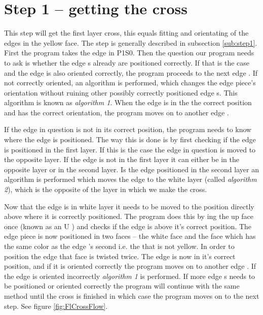 \section{Step 1 -- getting the cross}
This step will get the first layer cross, this equals fitting and orientating of the edges in the yellow face. 
The step is generally described in subsection \ref{sub:step1}.
First the program takes the edge \cubie{} in \cubicle{} P1S0.
Then the question our program needs to ask is whether the edge \cpiece{}s already are positioned correctly.
If that is the case and the edge \cpiece{} is also oriented correctly, the program proceeds to the next edge \cpiece{}.
If not correctly oriented, an algorithm is performed, which changes the edge piece's orientation without ruining other possibly correctly positioned edge \cpiece{}s. 
This algorithm is known as \textit{algorithm 1}. When the edge \cpiece{} is in the the correct position and has the correct orientation, the program moves on to another edge \cpiece{}. 

If the edge \cpiece{} in question is not in its correct position, the program needs to know where the edge is positioned. 
The way this is done is by first checking if the edge \cpiece{} is positioned in the first layer. 
If this is the case the edge \cpiece{} in question is moved to the opposite layer. 
If the edge \cpiece{} is not in the first layer it can either be in the opposite layer or in the second layer.
Is the edge \cpiece{}  positioned in the second layer an algorithm is performed which moves the edge \cpiece{}  to the white layer (called \textit{algorithm 2}), which is the opposite of the layer in which we make the cross.

Now that the edge \cpiece{}  is in white layer it needs to be moved to the position directly above where it is correctly positioned. 
The program does this by \twist{}ing the up face once (known as an U \twist{}) and checks if the edge \cpiece{} is above it's correct position.
The edge piece is now positioned in two faces -- the white face and the face which has the same color as the edge  \cpiece{}'s second \facelet{} i.e. the \facelet{} that is not yellow.
In order to position the edge \cpiece{} that face is twisted twice.
The edge \cpiece{} is now in it's correct position, and if it is oriented correctly the program moves on to another edge  \cpiece{} .
If the edge \cpiece{} is oriented incorrectly \textit{algorithm 1} is performed. If more edge  \cpiece{}s needs to be positioned or oriented correctly the program will continue with the same method until the cross is finished in which case the program moves on to the next step. See figure \ref{fig:FlCrossFlow}.

